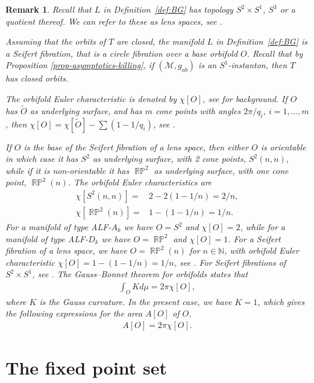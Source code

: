 \documentclass[a4paper,10pt,reqno]{amsart}
\newcommand{\cM}{\mathcal{M}}
\theoremstyle{plain}
\newtheorem{remark}[thm]{Remark}
\DeclareMathOperator{\RP}{\mathbb{R}\mathbb{P}}
\numberwithin{equation}{section}
\begin{document}
\begin{remark} \label{rem:seifert} 
Recall that $L$ in Definition~\ref{def:BG} has topology $S^2 \times S^1$, $S^3$ or a quotient thereof. We can refer to these as lens spaces, see \cite[\S 3]{MR3785783}.

Assuming that the orbits of $T$ are closed, the manifold $L$ in Definition~\ref{def:BG} is a Seifert fibration, that is a circle fibration over a base orbifold $O$.  Recall that by Proposition \ref{prop-asymptotics-killing}, if $(\cM, g_{ab})$ is an $S^1$-instanton, then  $T$ has closed orbits. 

The orbifold Euler characteristic is denoted by $\chi[O]$, see \cite[\ S 2]{MR705527} for background. If $O$ has $\tilde O$ as underlying surface, and has $m$ cone points with angles $2\pi/q_i$, $i=1,\dots, m$, then 
$\chi[O] =\chi[\tilde O] - \sum (1-1/q_i)$, see \cite[p. 427]{MR705527}. 

If $O$ is the base of the Seifert fibration of a lens space, then either  $O$ is orientable in which case it has $S^2$ as underlying surface,  with 2 cone points, $S^2(n,n)$, while if it is non-orientable it has $\RP^2$ as underlying surface, with one cone point, $\RP^2(n)$. The orbifold Euler characteristics are 
\begin{align} 
\chi[S^2(n,n)] ={}& 2 - 2(1-1/n) = 2/n , \\ 
\chi[\RP^2(n)] ={}& 1 - (1-1/n) = 1/n .
\end{align} 
For a manifold of type ALF-$A_k$ we have $O=S^2$ and $\chi[O] = 2$, while for a manifold of type ALF-$D_k$ we have $O=\RP^2$ and $\chi[O] = 1$. For a Seifert fibration of a lens space, we have $O = \RP^2(n)$ for $n \in \mathbb{N}$, with orbifold Euler characteristic $\chi[O] = 1 - (1 - 1/n) = 1/n$, see \cite[\ S 2]{MR705527}. For Seifert fibrations of $S^2 \times S^1$, see \cite[\S 4]{MR705527}. The Gauss--Bonnet theorem for orbifolds \cite[\ S 2]{MR705527} states that 
\begin{align} 
\int_O K d\mu = 2\pi \chi[O], 
\end{align}
where $K$ is the Gauss curvature. 
In the present case, we have $K=1$, which gives the following expressions for the area $A[O]$ of $O$, 
\begin{align} 
A[O] = 2\pi \chi[O] .
\end{align} 
\end{remark} 


%
\section{The fixed point set} \label{sec:S1ALF}
%
 
\end{document}
